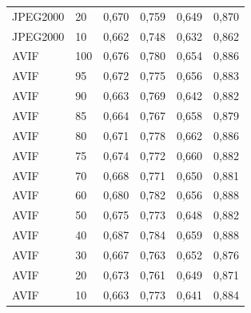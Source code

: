\documentclass[12pt,a4paper]{article}
\begin{document}
\begin{table}[H]
\begin{tabular}{llcccc}
JPEG2000 & 20  & 0{,}670 & 0{,}759 & 0{,}649 & 0{,}870 \\
JPEG2000 & 10  & 0{,}662 & 0{,}748 & 0{,}632 & 0{,}862 \\
\midrule
AVIF & 100 & 0{,}676 & 0{,}780 & 0{,}654 & 0{,}886 \\
AVIF & 95  & 0{,}672 & 0{,}775 & 0{,}656 & 0{,}883 \\
AVIF & 90  & 0{,}663 & 0{,}769 & 0{,}642 & 0{,}882 \\
AVIF & 85  & 0{,}664 & 0{,}767 & 0{,}658 & 0{,}879 \\
AVIF & 80  & 0{,}671 & 0{,}778 & 0{,}662 & 0{,}886 \\
AVIF & 75  & 0{,}674 & 0{,}772 & 0{,}660 & 0{,}882 \\
AVIF & 70  & 0{,}668 & 0{,}771 & 0{,}650 & 0{,}881 \\
AVIF & 60  & 0{,}680 & 0{,}782 & 0{,}656 & 0{,}888 \\
AVIF & 50  & 0{,}675 & 0{,}773 & 0{,}648 & 0{,}882 \\
AVIF & 40  & 0{,}687 & 0{,}784 & 0{,}659 & 0{,}888 \\
AVIF & 30  & 0{,}667 & 0{,}763 & 0{,}652 & 0{,}876 \\
AVIF & 20  & 0{,}673 & 0{,}761 & 0{,}649 & 0{,}871 \\
AVIF & 10  & 0{,}663 & 0{,}773 & 0{,}641 & 0{,}884 \\
\bottomrule
\end{tabular}
\end{table}
\end{document}
